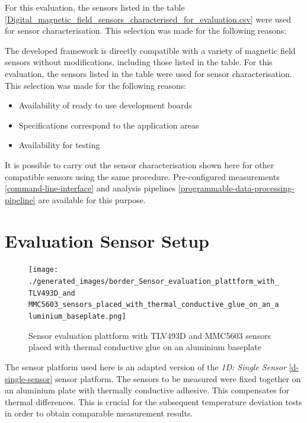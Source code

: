 For this evaluation, the sensors listed in the table
\ref{Digital_magnetic_field_sensors_characterised_for_evaluation.csv}
were used for sensor characterisation. This selection was made for the
following reasons:

The developed framework is directly compatible with a variety of
magnetic field sensors without modifications, including those listed in
the table. For this evaluation, the sensors listed in the table were
used for sensor characterisation. This selection was made for the
following reasons:

\begin{itemize}
\tightlist
\item
  Availability of ready to use development boards
\item
  Specifications correspond to the application areas
\item
  Availability for testing
\end{itemize}

It is possible to carry out the sensor characterisation shown here for
other compatible sensors using the same procedure. Pre-configured
measurements \ref{command-line-interface} and analysis pipelines
\ref{programmable-data-processing-pipeline} are available for this
purpose.

\hypertarget{evaluation-sensor-setup}{%
\section{Evaluation Sensor Setup}\label{evaluation-sensor-setup}}

\begin{figure}
\centering
\texttt{[image: ./generated\_images/border\_Sensor\_evaluation\_plattform\_with\_TLV493D\_and MMC5603\_sensors\_placed\_with\_thermal\_conductive\_glue\_on\_an\_aluminium\_baseplate.png]}
\caption{Sensor evaluation plattform with TLV493D and MMC5603 sensors
placed with thermal conductive glue on an aluminium baseplate
\label{Sensor_evaluation_plattform_with_TLV493D_and MMC5603_sensors_placed_with_thermal_conductive_glue_on_an_aluminium_baseplate.png}}
\end{figure}

The sensor platform used here is an adapted version of the \emph{1D:
Single Sensor} \ref{d-single-sensor} sensor platform. The sensors to be
measured were fixed together on an aluminium plate with thermally
conductive adhesive. This compensates for thermal differences. This is
crucial for the subsequent temperature deviation tests in order to
obtain comparable measurement results.

